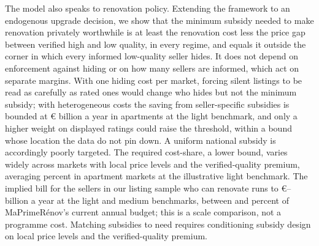 The model also speaks to renovation policy. Extending the framework to an endogenous upgrade
decision, we show that the minimum subsidy needed to make renovation privately worthwhile is at
least the renovation cost less the price gap between verified high and low quality, in every
regime, and equals it outside the corner in which every informed low-quality seller hides. It does
not depend on enforcement against hiding or on how many sellers are informed, which act on
separate margins. With one hiding cost per market, forcing silent listings to be read as carefully
as rated ones would change who hides but not the minimum subsidy; with heterogeneous costs the
saving from seller-specific subsidies is bounded at \euro{}\attSavingUbTwoFiftyApt{} billion a year in apartments at the light
benchmark, and only a higher weight on displayed ratings could raise the threshold, within a bound
whose location the data do not pin down.
A uniform national subsidy is accordingly poorly targeted. The required cost-share, a lower bound,
varies widely across markets with local price levels and the verified-quality premium, averaging
\attBaseCostShareTwoFiftyApt{} percent in apartment markets at the illustrative light benchmark.
The implied bill for the sellers in our listing sample who can renovate runs to
\euro{}\attScCostBaseTotTwoFifty{}--\attScCostBaseTotFiveHundred{} billion a year at the light and
medium benchmarks, between \attScCostBaseTotTwoFiftyLo{} and \attScCostBaseTotFiveHundredHi{}
percent of MaPrimeR\'enov's current annual budget; this is a scale comparison, not a programme
cost. Matching subsidies to need requires conditioning subsidy design on local price levels and the
verified-quality premium.

